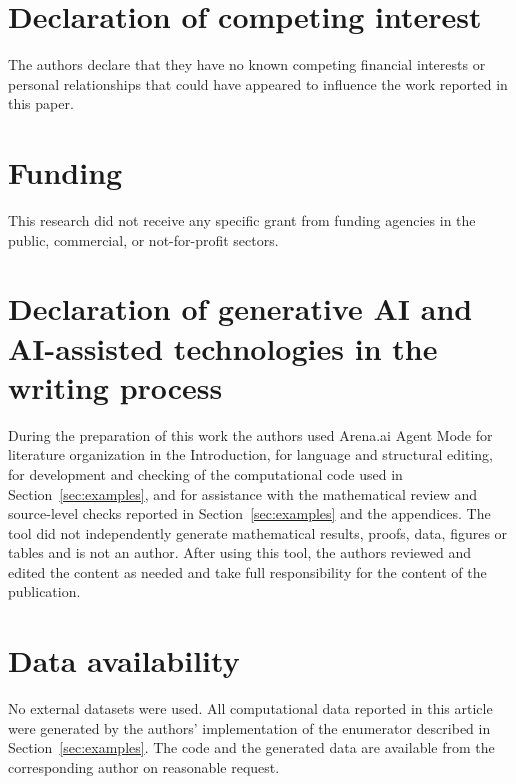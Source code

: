 \documentclass[preprint,12pt,a4paper]{elsarticle}
\theoremstyle{definition}
\theoremstyle{remark}
\begin{document}
\section*{Declaration of competing interest}
The authors declare that they have no known competing financial interests or
personal relationships that could have appeared to influence the work reported
in this paper.

\section*{Funding}
This research did not receive any specific grant from funding agencies in the
public, commercial, or not-for-profit sectors.

\section*{Declaration of generative AI and AI-assisted technologies in the
writing process}
During the preparation of this work the authors used Arena.ai Agent Mode for
literature organization in the Introduction, for language and structural
editing, for development and checking of the computational code used in
Section~\ref{sec:examples}, and for assistance with the mathematical review and
source-level checks reported in Section~\ref{sec:examples} and the appendices.
The tool did not independently generate mathematical results, proofs, data,
figures or tables and is not an author. After using this tool, the authors
reviewed and edited the content as needed and take full responsibility for the
content of the publication.

\section*{Data availability}
No external datasets were used. All computational data reported in this article
were generated by the authors' implementation of the enumerator described
in Section~\ref{sec:examples}. The code and the generated data are available
from the corresponding author on reasonable request.
\end{document}
